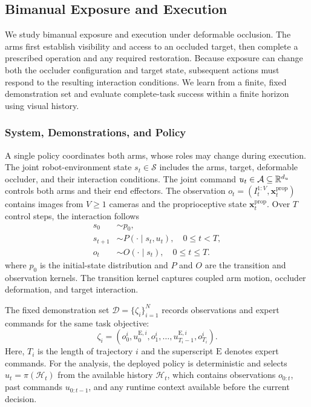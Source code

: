 \subsection{Bimanual Exposure and Execution}
\label{sec:task}

We study bimanual exposure and execution under deformable occlusion.
The arms first establish visibility and access to an occluded target, then complete a prescribed operation and any required restoration.
Because exposure can change both the occluder configuration and target state, subsequent actions must respond to the resulting interaction conditions.
We learn from a finite, fixed demonstration set and evaluate complete-task success within a finite horizon using visual history.

\subsubsection{System, Demonstrations, and Policy}

A single policy coordinates both arms, whose roles may change during execution.
The joint robot-environment state $s_t\in\mathcal S$ includes the arms, target, deformable occluder, and their interaction conditions.
The joint command $u_t\in\mathcal A\subseteq\mathbb R^{d_u}$ controls both arms and their end effectors.
The observation $o_t=(I_t^{1:V},\mathbf{x}_t^{\mathrm{prop}})$ contains images from $V\ge1$ cameras and the proprioceptive state $\mathbf{x}_t^{\mathrm{prop}}$.
Over $T$ control steps, the interaction follows
\begin{align}
 s_0&\sim p_0,\nonumber\\
 s_{t+1}&\sim P(\cdot\mid s_t,u_t),\quad 0\le t<T,\nonumber\\
 o_t&\sim O(\cdot\mid s_t),\quad 0\le t\le T.
 \label{eq:interactionmodel}
\end{align}
where $p_0$ is the initial-state distribution and $P$ and $O$ are the transition and observation kernels.
The transition kernel captures coupled arm motion, occluder deformation, and target interaction.

The fixed demonstration set $\mathcal D=\{\zeta_i\}_{i=1}^{N}$ records observations and expert commands for the same task objective:
\begin{equation}
 \zeta_i=(o_0^i,u_0^{\mathrm E,i},o_1^i,\ldots,
 u_{T_i-1}^{\mathrm E,i},o_{T_i}^i).
 \label{eq:demonstrations}
\end{equation}
Here, $T_i$ is the length of trajectory $i$ and the superscript $\mathrm E$ denotes expert commands.
For the analysis, the deployed policy is deterministic and selects $u_t=\pi(\mathcal H_t)$ from the available history $\mathcal H_t$, which contains observations $o_{0:t}$, past commands $u_{0:t-1}$, and any runtime context available before the current decision.

